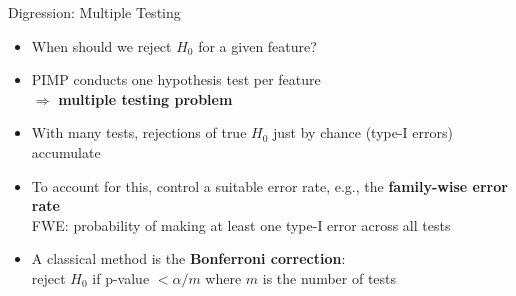 \documentclass[10pt,compress,t,notes=noshow, xcolor=table]{beamer}
\begin{document}
\begin{frame}{Digression: Multiple Testing }

\begin{itemize}%
  \item When should we reject $H_0$ for a given feature?
  \item PIMP conducts one hypothesis test per feature \\$\Rightarrow$ \textbf{multiple testing problem}
  \item With many tests, rejections of true $H_0$ just by chance (type-I errors) accumulate
  \item To account for this, control a suitable error rate, e.g., the \textbf{family-wise error rate}\\
  FWE: probability of making at least one type-I error across all tests
  \item A classical method is the \textbf{Bonferroni correction}:\\
  reject $H_0$ if p-value $< \alpha/m$ 
  where $m$ is the number of tests
\end{itemize}

\end{frame}


\endlecture
\end{document}
